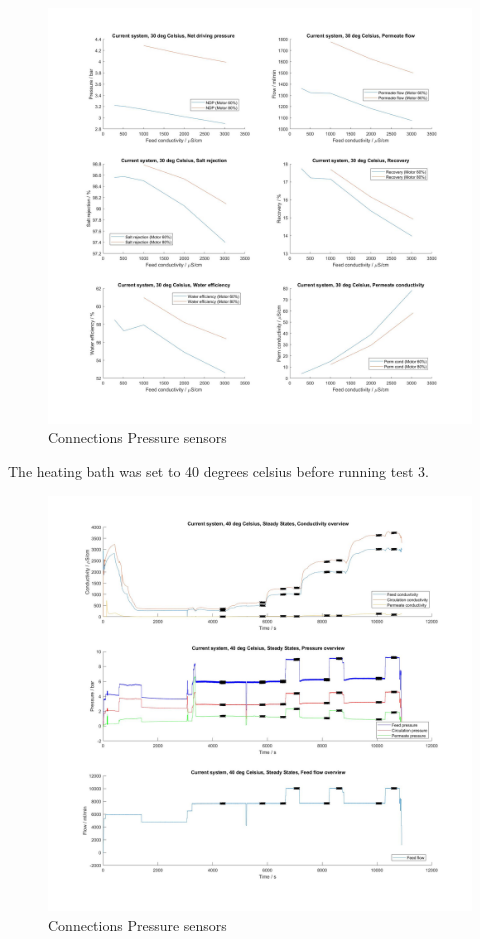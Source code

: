 \begin{figure}[H]
    \centering
    \includegraphics[width=1.1\textwidth]{Key30}
    \caption{Connections Pressure sensors}
    \label{fig:PressConn}
\end{figure}

\newpage

The heating bath was set to 40 degrees celsius before running test 3.

\begin{figure}[H]
    \centering
    \includegraphics[width=1.1\textwidth]{overview40}
    \caption{Connections Pressure sensors}
    \label{fig:PressConn}
\end{figure}


